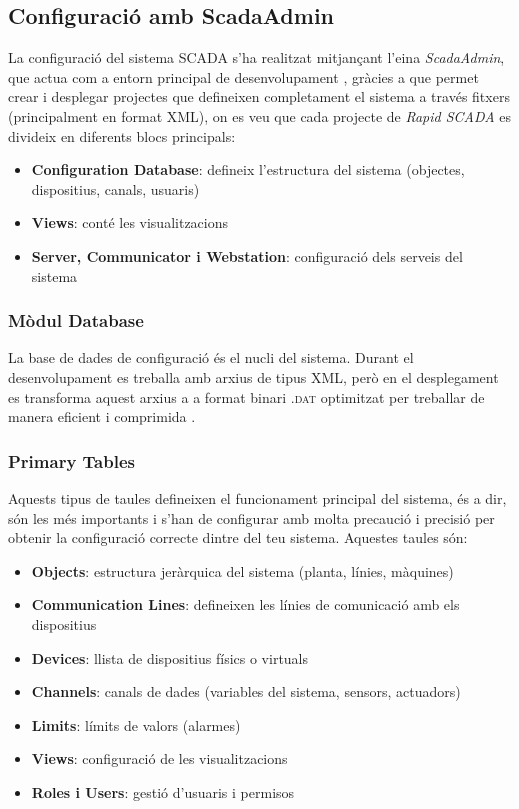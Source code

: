 \documentclass[a4paper,11pt,DIV=13,headings=normal,abstract=true,twoside=semi]{article}
\newcommand{\acro}[1]{\textsc{#1}}
\begin{document}
\subsection{Configuració amb ScadaAdmin}

La configuració del sistema \acro{SCADA} s'ha realitzat mitjançant l'eina \emph{ScadaAdmin}, que actua com a entorn principal de desenvolupament \cite{rapidscada_config_basics}, gràcies a que permet crear i desplegar projectes que defineixen completament el sistema a través fitxers (principalment en format XML), on es veu que cada projecte de \emph{Rapid SCADA} es divideix en diferents blocs principals:

\begin{itemize}
    \item \textbf{Configuration Database}: defineix l'estructura del sistema (objectes, dispositius, canals, usuaris)
    \item \textbf{Views}: conté les visualitzacions
    \item \textbf{Server, Communicator i Webstation}: configuració dels serveis del sistema
\end{itemize}

\subsubsection{Mòdul Database}

La base de dades de configuració és el nucli del sistema. Durant el desenvolupament es treballa amb arxius de tipus XML, però en el desplegament es transforma aquest arxius a a format binari \acro{.dat} optimitzat per treballar de manera eficient i comprimida \cite{rapidscada_database}.

\subsubsection*{Primary Tables}

Aquests tipus de taules defineixen el funcionament principal del sistema, és a dir, són les més importants i s'han de configurar amb molta precaució i precisió per obtenir la configuració correcte dintre del teu sistema. Aquestes taules són:

\begin{itemize}
    \item \textbf{Objects}: estructura jeràrquica del sistema (planta, línies, màquines)
    \item \textbf{Communication Lines}: defineixen les línies de comunicació amb els dispositius
    \item \textbf{Devices}: llista de dispositius físics o virtuals
    \item \textbf{Channels}: canals de dades (variables del sistema, sensors, actuadors)
    \item \textbf{Limits}: límits de valors (alarmes)
    \item \textbf{Views}: configuració de les visualitzacions
    \item \textbf{Roles i Users}: gestió d'usuaris i permisos
\end{itemize}
\end{document}
